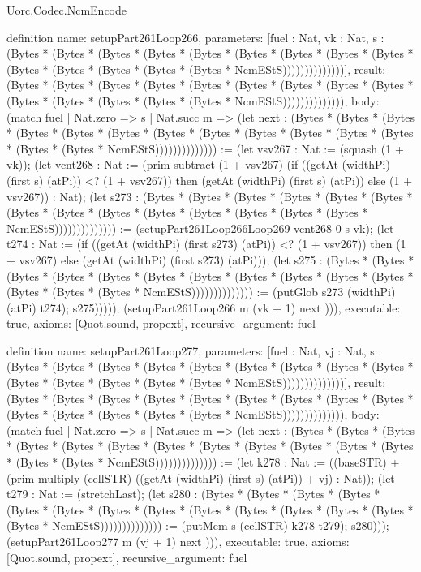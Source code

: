\begin{lexlean}{Uorc.Codec.NcmEncode}
\begin{semanticmodule}
definition{
  name: setupPart261Loop266,
  parameters: [fuel : Nat, vk : Nat, s : (Bytes * (Bytes * (Bytes * (Bytes * (Bytes * (Bytes * (Bytes * (Bytes * (Bytes * (Bytes * (Bytes * (Bytes * (Bytes * (Bytes * NcmEStS))))))))))))))],
  result: (Bytes * (Bytes * (Bytes * (Bytes * (Bytes * (Bytes * (Bytes * (Bytes * (Bytes * (Bytes * (Bytes * (Bytes * (Bytes * (Bytes * NcmEStS)))))))))))))),
  body: (match fuel
    | Nat.zero => s
    | Nat.succ m => (let next : (Bytes * (Bytes * (Bytes * (Bytes * (Bytes * (Bytes * (Bytes * (Bytes * (Bytes * (Bytes * (Bytes * (Bytes * (Bytes * (Bytes * NcmEStS)))))))))))))) := (let vsv267 : Nat := (squash (1 + vk)); (let vcnt268 : Nat := (prim subtract (1 + vsv267) (if ((getAt (widthPi) (first s) (atPi)) <? (1 + vsv267)) then (getAt (widthPi) (first s) (atPi)) else (1 + vsv267)) : Nat); (let s273 : (Bytes * (Bytes * (Bytes * (Bytes * (Bytes * (Bytes * (Bytes * (Bytes * (Bytes * (Bytes * (Bytes * (Bytes * (Bytes * (Bytes * NcmEStS)))))))))))))) := (setupPart261Loop266Loop269 vcnt268 0 s vk); (let t274 : Nat := (if ((getAt (widthPi) (first s273) (atPi)) <? (1 + vsv267)) then (1 + vsv267) else (getAt (widthPi) (first s273) (atPi))); (let s275 : (Bytes * (Bytes * (Bytes * (Bytes * (Bytes * (Bytes * (Bytes * (Bytes * (Bytes * (Bytes * (Bytes * (Bytes * (Bytes * (Bytes * NcmEStS)))))))))))))) := (putGlob s273 (widthPi) (atPi) t274); s275))))); (setupPart261Loop266 m (vk + 1) next ))),
  executable: true,
  axioms: [Quot.sound, propext],
  recursive_argument: fuel
}

definition{
  name: setupPart261Loop277,
  parameters: [fuel : Nat, vj : Nat, s : (Bytes * (Bytes * (Bytes * (Bytes * (Bytes * (Bytes * (Bytes * (Bytes * (Bytes * (Bytes * (Bytes * (Bytes * (Bytes * (Bytes * NcmEStS))))))))))))))],
  result: (Bytes * (Bytes * (Bytes * (Bytes * (Bytes * (Bytes * (Bytes * (Bytes * (Bytes * (Bytes * (Bytes * (Bytes * (Bytes * (Bytes * NcmEStS)))))))))))))),
  body: (match fuel
    | Nat.zero => s
    | Nat.succ m => (let next : (Bytes * (Bytes * (Bytes * (Bytes * (Bytes * (Bytes * (Bytes * (Bytes * (Bytes * (Bytes * (Bytes * (Bytes * (Bytes * (Bytes * NcmEStS)))))))))))))) := (let k278 : Nat := ((baseSTR) + (prim multiply (cellSTR) ((getAt (widthPi) (first s) (atPi)) + vj) : Nat)); (let t279 : Nat := (stretchLast); (let s280 : (Bytes * (Bytes * (Bytes * (Bytes * (Bytes * (Bytes * (Bytes * (Bytes * (Bytes * (Bytes * (Bytes * (Bytes * (Bytes * (Bytes * NcmEStS)))))))))))))) := (putMem s (cellSTR) k278 t279); s280))); (setupPart261Loop277 m (vj + 1) next ))),
  executable: true,
  axioms: [Quot.sound, propext],
  recursive_argument: fuel
}


\end{semanticmodule}
\end{lexlean}
